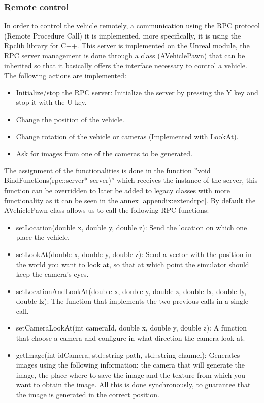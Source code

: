 \documentclass[10pt,a4paper,twocolumn,twoside]{article}
\begin{document}
\subsubsection{Remote control}
\label{rpcserver}

In order to control the vehicle remotely, a communication using the RPC protocol (Remote Procedure Call) it is implemented, more specifically, it is using the Rpclib\cite{rpclib} library for C++. This server is implemented on the Unreal module, the RPC server management is done through a class (AVehiclePawn) that can be inherited so that it basically offers the interface necessary to control a vehicle. The following actions are implemented:

\begin{itemize}
\item Initialize/stop the RPC server: Initialize the server by pressing the Y key and stop it with the U key.
\item Change the position of the vehicle.
\item Change rotation of the vehicle or cameras (Implemented with LookAt).
\item Ask for images from one of the cameras to be generated.
\end{itemize}

The assignment of the functionalities is done in the function ''void BindFunctions(rpc::server* server)'' which receives the instance of the server, this function can be overridden to later be added to legacy classes with more functionality as it can be seen in the annex \ref{appendix:extendrpc}. By default the AVehiclePawn class allows us to call the following RPC functions:

\begin{itemize}
\item setLocation(double x, double y, double z): Send the location on which one place the vehicle.

\item setLookAt(double x, double y, double z): Send a vector with the position in the world you want to look at, so that at which point the simulator should keep the camera's eyes.

\item setLocationAndLookAt(double x, double y, double z, double lx, double ly, double lz): The function that implements the two previous calls in a single call.

\item setCameraLookAt(int cameraId, double x, double y, double z): A function that choose a camera and configure in what direction the camera look at.

\item getImage(int idCamera, std::string path, std::string channel): Generates images using the following information: the camera that will generate the image, the place where to save the image and the texture from which you want to obtain the image. All this is done synchronously, to guarantee that the image is generated in the correct position.
\end{itemize}
\end{document}
